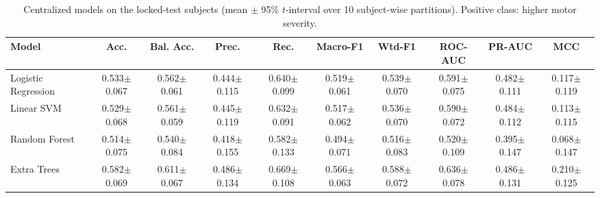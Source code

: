 \begin{table}[!t]\centering\caption{Centralized models on the locked-test subjects (mean $\pm$ 95\% $t$-interval over 10 subject-wise partitions). Positive class: higher motor severity.}\label{tab:central}\scriptsize\setlength{\tabcolsep}{3pt}\begin{tabular}{lccccccccc}\toprule
Model & Acc. & Bal. Acc. & Prec. & Rec. & Macro-F1 & Wtd-F1 & ROC-AUC & PR-AUC & MCC\\\midrule
Logistic Regression & 0.533$\pm$0.067 & 0.562$\pm$0.061 & 0.444$\pm$0.115 & 0.640$\pm$0.099 & 0.519$\pm$0.061 & 0.539$\pm$0.070 & 0.591$\pm$0.075 & 0.482$\pm$0.111 & 0.117$\pm$0.119\\
Linear SVM & 0.529$\pm$0.068 & 0.561$\pm$0.059 & 0.445$\pm$0.119 & 0.632$\pm$0.091 & 0.517$\pm$0.062 & 0.536$\pm$0.070 & 0.590$\pm$0.072 & 0.484$\pm$0.112 & 0.113$\pm$0.115\\
Random Forest & 0.514$\pm$0.075 & 0.540$\pm$0.084 & 0.418$\pm$0.155 & 0.582$\pm$0.133 & 0.494$\pm$0.071 & 0.516$\pm$0.083 & 0.520$\pm$0.109 & 0.395$\pm$0.147 & 0.068$\pm$0.147\\
Extra Trees & 0.582$\pm$0.069 & 0.611$\pm$0.067 & 0.486$\pm$0.134 & 0.669$\pm$0.108 & 0.566$\pm$0.063 & 0.588$\pm$0.072 & 0.636$\pm$0.078 & 0.486$\pm$0.131 & 0.210$\pm$0.125\\
\bottomrule\end{tabular}\end{table}
